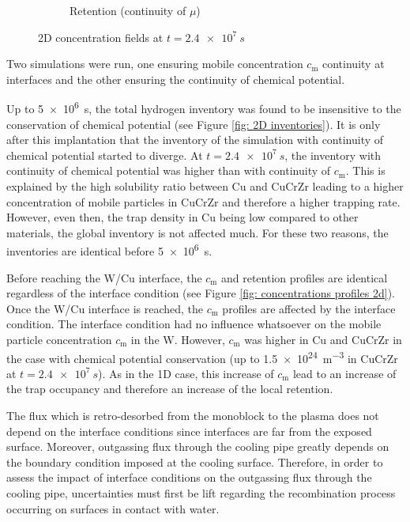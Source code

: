 \begin{figure}
\begin{subfigure}{0.5\linewidth}
        \caption{Retention (continuity of $\mu$)}
    \end{subfigure}
    \caption{2D concentration fields at $t=\SI{2.4e7}{s}$}
    \label{fig: concentrations fields 2d}
\end{figure}
Two simulations were run, one ensuring mobile concentration $c_\mathrm{m}$ continuity at interfaces and the other ensuring the continuity of chemical potential.

Up to \SI{5e6}{s}, the total hydrogen inventory was found to be insensitive to the conservation of chemical potential (see Figure \ref{fig: 2D inventories}).
It is only after this implantation that the inventory of the simulation with continuity of chemical potential started to diverge.
At $t=\SI{2.4e7}{s}$, the inventory with continuity of chemical potential was higher than with continuity of $c_\mathrm{m}$.
This is explained by the high solubility ratio between Cu and CuCrZr leading to a higher concentration of mobile particles in CuCrZr and therefore a higher trapping rate.
However, even then, the trap density in Cu being low compared to other materials, the global inventory is not affected much.
For these two reasons, the inventories are identical before \SI{5e6}{s}.

Before reaching the W/Cu interface, the $c_\mathrm{m}$ and retention profiles are identical regardless of the interface condition (see Figure \ref{fig: concentrations profiles 2d}).
Once the W/Cu interface is reached, the $c_\mathrm{m}$ profiles are affected by the interface condition.
The interface condition had no influence whatsoever on the mobile particle concentration $c_\mathrm{m}$ in the W.
However, $c_\mathrm{m}$ was higher in Cu and CuCrZr in the case with chemical potential conservation (up to \SI{1.5e24}{m^{-3}} in CuCrZr at $t=\SI{2.4e7}{s}$).
As in the 1D case, this increase of $c_\mathrm{m}$ lead to an increase of the trap occupancy and therefore an increase of the local retention.

The flux which is retro-desorbed from the monoblock to the plasma does not depend on the interface conditions since interfaces are far from the exposed surface.
Moreover, outgassing flux through the cooling pipe greatly depends on the boundary condition imposed at the cooling surface.
Therefore, in order to assess the impact of interface conditions on the outgassing flux through the cooling pipe, uncertainties must first be lift regarding the recombination process occurring on surfaces in contact with water.


